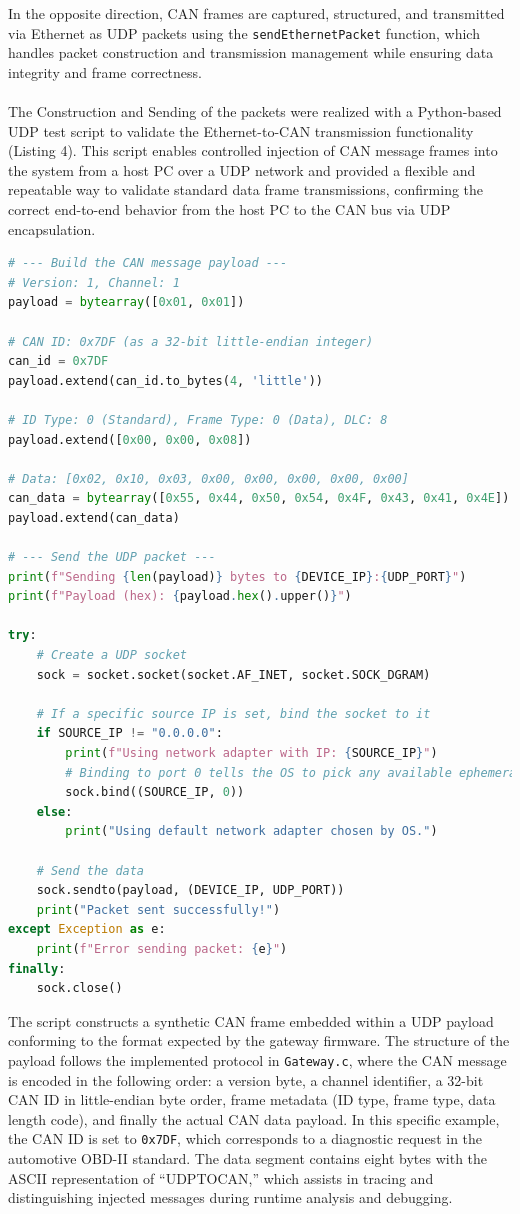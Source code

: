 In the opposite direction, CAN frames are captured, structured, and transmitted via Ethernet as UDP packets using the \verb|sendEthernetPacket| function, which handles packet construction and transmission management while ensuring data integrity and frame correctness.\\\\
The Construction and Sending of the packets were realized with a Python-based UDP test script to validate the Ethernet-to-CAN transmission functionality (Listing 4). This script enables controlled injection of CAN message frames into the system from a host PC over a UDP network and provided a flexible and repeatable way to validate standard data frame transmissions, confirming the correct end-to-end behavior from the host PC to the CAN bus via UDP encapsulation.
\begin{lstlisting}[language=python, caption={UDP Packet Sending}, label={lst:packet_sender}]
# --- Build the CAN message payload ---
# Version: 1, Channel: 1
payload = bytearray([0x01, 0x01])

# CAN ID: 0x7DF (as a 32-bit little-endian integer)
can_id = 0x7DF
payload.extend(can_id.to_bytes(4, 'little'))

# ID Type: 0 (Standard), Frame Type: 0 (Data), DLC: 8
payload.extend([0x00, 0x00, 0x08])

# Data: [0x02, 0x10, 0x03, 0x00, 0x00, 0x00, 0x00, 0x00]
can_data = bytearray([0x55, 0x44, 0x50, 0x54, 0x4F, 0x43, 0x41, 0x4E])
payload.extend(can_data)

# --- Send the UDP packet ---
print(f"Sending {len(payload)} bytes to {DEVICE_IP}:{UDP_PORT}")
print(f"Payload (hex): {payload.hex().upper()}")

try:
    # Create a UDP socket
    sock = socket.socket(socket.AF_INET, socket.SOCK_DGRAM)

    # If a specific source IP is set, bind the socket to it
    if SOURCE_IP != "0.0.0.0":
        print(f"Using network adapter with IP: {SOURCE_IP}")
        # Binding to port 0 tells the OS to pick any available ephemeral port
        sock.bind((SOURCE_IP, 0))
    else:
        print("Using default network adapter chosen by OS.")

    # Send the data
    sock.sendto(payload, (DEVICE_IP, UDP_PORT))
    print("Packet sent successfully!")
except Exception as e:
    print(f"Error sending packet: {e}")
finally:
    sock.close()
\end{lstlisting}
The script constructs a synthetic CAN frame embedded within a UDP payload conforming to the format expected by the gateway firmware. The structure of the payload follows the implemented protocol in \verb|Gateway.c|, where the CAN message is encoded in the following order: a version byte, a channel identifier, a 32-bit CAN ID in little-endian byte order, frame metadata (ID type, frame type, data length code), and finally the actual CAN data payload. In this specific example, the CAN ID is set to \verb|0x7DF|, which corresponds to a diagnostic request in the automotive OBD-II standard. The data segment contains eight bytes with the ASCII representation of “UDPTOCAN,” which assists in tracing and distinguishing injected messages during runtime analysis and debugging.\\\\
